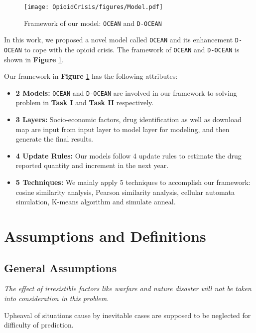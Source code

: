 \documentclass[a4paper]{article}
\begin{document}
\begin{figure}[h]
	\centering  
	\texttt{[image: OpioidCrisis/figures/Model.pdf]} 
	\caption{Framework of our model: \texttt{OCEAN} and \texttt{D-OCEAN}} 
	\label{fig:model}
\end{figure}

In this work, we proposed a novel model called \texttt{OCEAN} and its enhancement \texttt{D-OCEAN} to cope with the opioid crisis. The framework of \texttt{OCEAN} and \texttt{D-OCEAN} is shown in \textbf{Figure} \ref{fig:model}.

Our framework in \textbf{Figure} \ref{fig:model} has the following attributes:

\begin{itemize}
    \item \textbf{\large{2} \normalsize Models:} \texttt{OCEAN} and \texttt{D-OCEAN} are involved in our framework to solving problem in \textbf{Task I} and \textbf{Task II} respectively.
    \item \textbf{\large{3} \normalsize Layers:} Socio-economic factors, drug identification as well as download map are input from \textsf{input layer} to \textsf{model layer} for modeling, and then generate the final results. 
    \item \textbf{\large{4} \normalsize Update Rules:} Our models follow 4 update rules to estimate the drug reported quantity and increment in the next year.
    \item \textbf{\large{5} \normalsize Techniques:} We mainly apply 5 techniques to accomplish our framework: cosine similarity analysis, Pearson similarity analysis, cellular automata simulation, K-means algorithm and simulate anneal.
\end{itemize}
\vspace{4pt}


\section{Assumptions and Definitions}

\subsection{General Assumptions}

\vspace{4pt}
\begin{assumption}
  \textit{The effect of irresistible factors like warfare and nature disaster will not be taken into consideration in this problem.}
\end{assumption}
Upheaval of situations cause by inevitable cases are supposed to be neglected for difficulty of prediction.
\end{document}
